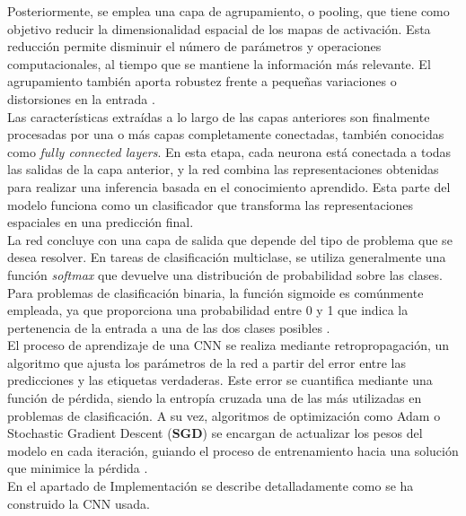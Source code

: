 \documentclass[12pt]{article} %
\begin{document}
Posteriormente, se emplea una capa de agrupamiento, o pooling, que tiene como objetivo reducir la dimensionalidad espacial de los mapas de activación. Esta reducción permite disminuir el número de parámetros y operaciones computacionales, al tiempo que se mantiene la información más relevante. El agrupamiento también aporta robustez frente a pequeñas variaciones o distorsiones en la entrada \cite{sermanet2013overfeat}. \\

Las características extraídas a lo largo de las capas anteriores son finalmente procesadas por una o más capas completamente conectadas, también conocidas como \textit{fully connected layers}. En esta etapa, cada neurona está conectada a todas las salidas de la capa anterior, y la red combina las representaciones obtenidas para realizar una inferencia basada en el conocimiento aprendido. Esta parte del modelo funciona como un clasificador que transforma las representaciones espaciales en una predicción final.\\

La red concluye con una capa de salida que depende del tipo de problema que se desea resolver. En tareas de clasificación multiclase, se utiliza generalmente una función \textit{softmax} que devuelve una distribución de probabilidad sobre las clases. Para problemas de clasificación binaria, la función sigmoide es comúnmente empleada, ya que proporciona una probabilidad entre 0 y 1 que indica la pertenencia de la entrada a una de las dos clases posibles \cite{bishop2006pattern}.\\

El proceso de aprendizaje de una CNN se realiza mediante retropropagación, un algoritmo que ajusta los parámetros de la red a partir del error entre las predicciones y las etiquetas verdaderas. Este error se cuantifica mediante una función de pérdida, siendo la entropía cruzada una de las más utilizadas en problemas de clasificación. A su vez, algoritmos de optimización como Adam o Stochastic Gradient Descent (\textbf{SGD}) se encargan de actualizar los pesos del modelo en cada iteración, guiando el proceso de entrenamiento hacia una solución que minimice la pérdida \cite{kingma2014adam,rumelhart1986learning}. \\

En el apartado de Implementación se describe detalladamente como se ha construido la CNN usada.
\end{document}

